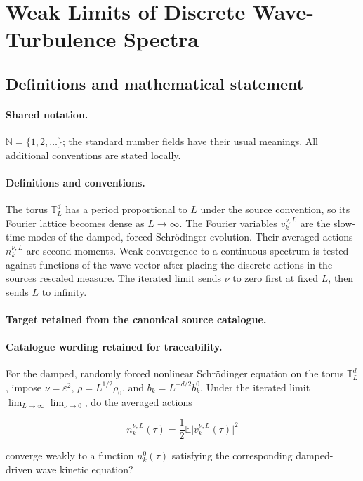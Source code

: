 \documentclass[11pt]{article}
\begin{document}
\section{Weak Limits of Discrete Wave-Turbulence Spectra}\label{statement}

\subsection{Definitions and mathematical statement}

\paragraph{Shared notation.}$\mathbb N=\{1,2,\ldots\}$; the standard number fields have their usual meanings. All additional conventions are stated locally.


\paragraph{Definitions and conventions.}
The torus $\mathbb T_L^d$ has a period proportional to $L$ under the source convention, so its Fourier lattice becomes dense as $L\to\infty$. The Fourier variables $v_k^{\nu,L}$ are the slow-time modes of the damped, forced Schrödinger evolution. Their averaged actions $n_k^{\nu,L}$ are second moments. Weak convergence to a continuous spectrum is tested against functions of the wave vector after placing the discrete actions in the source\textquotesingle s rescaled measure. The iterated limit sends $\nu$ to zero first at fixed $L$, then sends $L$ to infinity.

\paragraph{Target retained from the canonical source catalogue.}
\paragraph{Catalogue wording retained for traceability.}
For the damped, randomly forced nonlinear Schrödinger equation on the torus $\mathbb T_L^d$, impose $\nu=\varepsilon^2$, $\rho=L^{1/2}\rho_0$, and $b_k=L^{-d/2}b_k^0$. Under the iterated limit $\lim_{L\to\infty}\lim_{\nu\to0}$, do the averaged actions

$$n_k^{\nu,L}(\tau)=\frac12\mathbb E\lvert v_k^{\nu,L}(\tau)\rvert^2$$

converge weakly to a function $n_k^0(\tau)$ satisfying the corresponding damped-driven wave kinetic equation?
\end{document}
